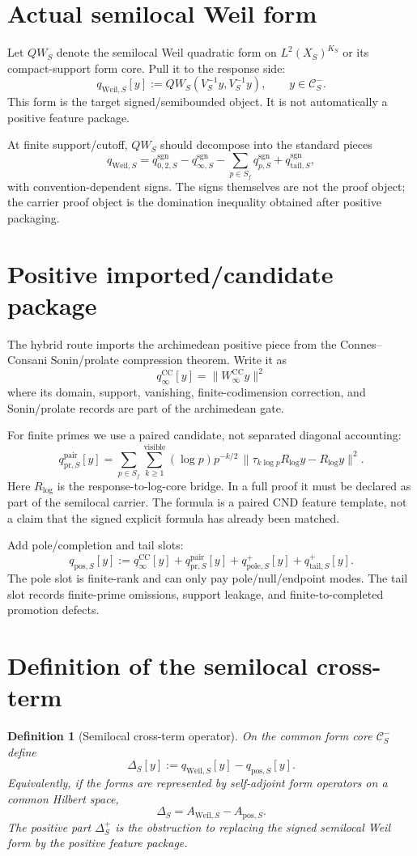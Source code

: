 \documentclass[11pt]{article}
\newtheorem{definition}{Definition}
\newcommand{\CS}{\mathcal C}
\newcommand{\Pos}{\mathrm{pos}}
\newcommand{\Weil}{\mathrm{Weil}}
\newcommand{\cc}{\mathrm{CC}}
\newcommand{\pr}{\mathrm{pr}}
\newcommand{\tail}{\mathrm{tail}}
\newcommand{\pole}{\mathrm{pole}}
\begin{document}
\section{Actual semilocal Weil form}
Let $QW_S$ denote the semilocal Weil quadratic form on $L^2(X_S)^{K_S}$ or its compact-support form core.  Pull it to the response side:
\[
\boxed{
q_{\Weil,S}[y]
:=QW_S(V_S^{-1}y,V_S^{-1}y),
\qquad y\in\CS_S^-.
}
\]
This form is the target signed/semibounded object.  It is not automatically a positive feature package.

At finite support/cutoff, $QW_S$ should decompose into the standard pieces
\[
q_{\Weil,S}
= q_{0,2,S}^{\mathrm{sgn}}
-q_{\infty,S}^{\mathrm{sgn}}
-\sum_{p\in S_f}q_{p,S}^{\mathrm{sgn}}
+q_{\tail,S}^{\mathrm{sgn}},
\]
with convention-dependent signs.  The signs themselves are not the proof object; the carrier proof object is the domination inequality obtained after positive packaging.

\section{Positive imported/candidate package}
The hybrid route imports the archimedean positive piece from the Connes--Consani Sonin/prolate compression theorem.  Write it as
\[
q_\infty^{\cc}[y]
=\|W_\infty^{\cc}y\|^2
\]
where its domain, support, vanishing, finite-codimension correction, and Sonin/prolate records are part of the archimedean gate.

For finite primes we use a paired candidate, not separated diagonal accounting:
\[
q_{\pr,S}^{\mathrm{pair}}[y]
=
\sum_{p\in S_f}\sum_{k\ge1}^{\mathrm{visible}}
(\log p)p^{-k/2}\,
\|\tau_{k\log p}R_{\log}y-R_{\log}y\|^2.
\]
Here $R_{\log}$ is the response-to-log-core bridge.  In a full proof it must be declared as part of the semilocal carrier.  The formula is a paired CND feature template, not a claim that the signed explicit formula has already been matched.

Add pole/completion and tail slots:
\[
q_{\Pos,S}[y]
:=q_\infty^{\cc}[y]+q_{\pr,S}^{\mathrm{pair}}[y]+q_{\pole,S}^+[y]+q_{\tail,S}^+[y].
\]
The pole slot is finite-rank and can only pay pole/null/endpoint modes.  The tail slot records finite-prime omissions, support leakage, and finite-to-completed promotion defects.

\section{Definition of the semilocal cross-term}
\begin{definition}[Semilocal cross-term operator]
On the common form core $\CS_S^-$ define
\[
\boxed{
\Delta_S[y]
:=q_{\Weil,S}[y]-q_{\Pos,S}[y].
}
\]
Equivalently, if the forms are represented by self-adjoint form operators on a common Hilbert space,
\[
\boxed{
\Delta_S=A_{\Weil,S}-A_{\Pos,S}.
}
\]
The positive part $\Delta_S^+$ is the obstruction to replacing the signed semilocal Weil form by the positive feature package.
\end{definition}
\end{document}
